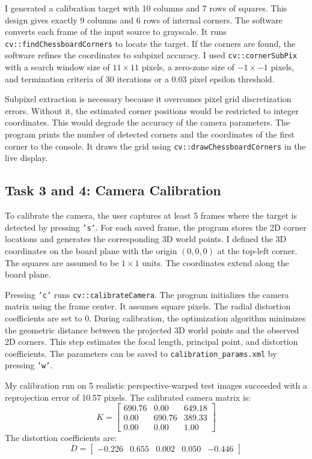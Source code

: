 \documentclass[11pt,letterpaper]{article}
\begin{document}
I generated a calibration target with 10 columns and 7 rows of squares. This design gives exactly 9 columns and 6 rows of internal corners. The software converts each frame of the input source to grayscale. It runs \texttt{cv::findChessboardCorners} to locate the target. If the corners are found, the software refines the coordinates to subpixel accuracy. I used \texttt{cv::cornerSubPix} with a search window size of $11 \times 11$ pixels, a zero-zone size of $-1 \times -1$ pixels, and termination criteria of 30 iterations or a $0.03$ pixel epsilon threshold. 

Subpixel extraction is necessary because it overcomes pixel grid discretization errors. Without it, the estimated corner positions would be restricted to integer coordinates. This would degrade the accuracy of the camera parameters. The program prints the number of detected corners and the coordinates of the first corner to the console. It draws the grid using \texttt{cv::drawChessboardCorners} in the live display.

\subsection*{Task 3 and 4: Camera Calibration}

To calibrate the camera, the user captures at least 5 frames where the target is detected by pressing \texttt{'s'}. For each saved frame, the program stores the 2D corner locations and generates the corresponding 3D world points. I defined the 3D coordinates on the board plane with the origin $(0, 0, 0)$ at the top-left corner. The squares are assumed to be $1 \times 1$ units. The coordinates extend along the board plane.

Pressing \texttt{'c'} runs \texttt{cv::calibrateCamera}. The program initializes the camera matrix using the frame center. It assumes square pixels. The radial distortion coefficients are set to 0. During calibration, the optimization algorithm minimizes the geometric distance between the projected 3D world points and the observed 2D corners. This step estimates the focal length, principal point, and distortion coefficients. The parameters can be saved to \texttt{calibration\_params.xml} by pressing \texttt{'w'}.

My calibration run on 5 realistic perspective-warped test images succeeded with a reprojection error of 10.57 pixels. The calibrated camera matrix is:
\[
K = \begin{bmatrix}
690.76 & 0.00 & 649.18 \\
0.00 & 690.76 & 389.33 \\
0.00 & 0.00 & 1.00
\end{bmatrix}
\]
The distortion coefficients are:
\[
D = \begin{bmatrix} -0.226 & 0.655 & 0.002 & 0.050 & -0.446 \end{bmatrix}
\]
\end{document}
